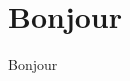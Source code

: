 \documentclass[letterpaper,12pt,oneside]{article}  %
\begin{document}
\section{Bonjour}

Bonjour
\end{document}
